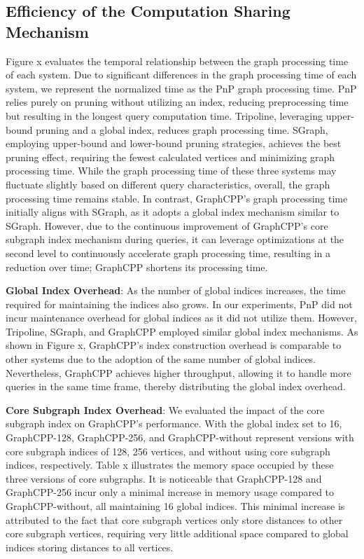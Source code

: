 \documentclass[lettersize,journal]{IEEEtran} %
\begin{document}
\subsection{Efficiency of the Computation Sharing Mechanism}
Figure x evaluates the temporal relationship between the graph processing time of each system. Due to significant differences in the graph processing time of each system, we represent the normalized time as the PnP graph processing time. PnP relies purely on pruning without utilizing an index, reducing preprocessing time but resulting in the longest query computation time. Tripoline, leveraging upper-bound pruning and a global index, reduces graph processing time. SGraph, employing upper-bound and lower-bound pruning strategies, achieves the best pruning effect, requiring the fewest calculated vertices and minimizing graph processing time. While the graph processing time of these three systems may fluctuate slightly based on different query characteristics, overall, the graph processing time remains stable. In contrast, GraphCPP's graph processing time initially aligns with SGraph, as it adopts a global index mechanism similar to SGraph. However, due to the continuous improvement of GraphCPP's core subgraph index mechanism during queries, it can leverage optimizations at the second level to continuously accelerate graph processing time, resulting in a reduction over time; GraphCPP shortens its processing time.

{\bf{Global Index Overhead}}: As the number of global indices increases, the time required for maintaining the indices also grows. In our experiments, PnP did not incur maintenance overhead for global indices as it did not utilize them. However, Tripoline, SGraph, and GraphCPP employed similar global index mechanisms. As shown in Figure x, GraphCPP's index construction overhead is comparable to other systems due to the adoption of the same number of global indices. Nevertheless, GraphCPP achieves higher throughput, allowing it to handle more queries in the same time frame, thereby distributing the global index overhead.

{\bf{Core Subgraph Index Overhead}}: We evaluated the impact of the core subgraph index on GraphCPP's performance. With the global index set to 16, GraphCPP-128, GraphCPP-256, and GraphCPP-without represent versions with core subgraph indices of 128, 256 vertices, and without using core subgraph indices, respectively. Table x illustrates the memory space occupied by these three versions of core subgraphs. It is noticeable that GraphCPP-128 and GraphCPP-256 incur only a minimal increase in memory usage compared to GraphCPP-without, all maintaining 16 global indices. This minimal increase is attributed to the fact that core subgraph vertices only store distances to other core subgraph vertices, requiring very little additional space compared to global indices storing distances to all vertices.
\end{document}
